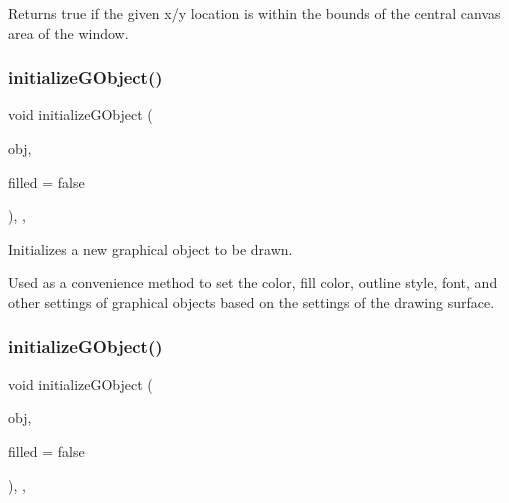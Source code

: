 Returns true if the given x/y location is within the bounds of the central canvas area of the window. 

\mbox{\label{classGDrawingSurface_a814498efebc5586645159cd22990cf61}} 
\subsubsection{\texorpdfstring{initialize\+G\+Object()}{initializeGObject()}\hspace{0.1cm}{\footnotesize\ttfamily [1/2]}}
{\footnotesize\ttfamily void initialize\+G\+Object (\begin{DoxyParamCaption}\item[{\mbox{\hyperlink{classGObject}{G\+Object}} \&}]{obj,  }\item[{bool}]{filled = {\ttfamily false} }\end{DoxyParamCaption})\hspace{0.3cm}{\ttfamily [protected]}, {\ttfamily [virtual]}, {\ttfamily [inherited]}}



Initializes a new graphical object to be drawn. 

Used as a convenience method to set the color, fill color, outline style, font, and other settings of graphical objects based on the settings of the drawing surface. \mbox{\label{classGDrawingSurface_a43e6bc951980da061ddc40407daee227}} 
\subsubsection{\texorpdfstring{initialize\+G\+Object()}{initializeGObject()}\hspace{0.1cm}{\footnotesize\ttfamily [2/2]}}
{\footnotesize\ttfamily void initialize\+G\+Object (\begin{DoxyParamCaption}\item[{\mbox{\hyperlink{classGObject}{G\+Object}} $\ast$}]{obj,  }\item[{bool}]{filled = {\ttfamily false} }\end{DoxyParamCaption})\hspace{0.3cm}{\ttfamily [protected]}, {\ttfamily [virtual]}, {\ttfamily [inherited]}}




